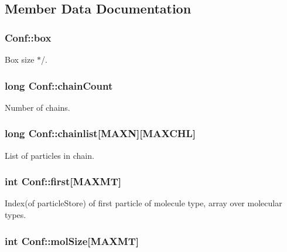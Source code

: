 \subsection{Member Data Documentation}
\hypertarget{class_conf_a98e73199812404fd886619f90f0b26e7}{
\subsubsection[{box}]{ Conf\+::box}}\label{class_conf_a98e73199812404fd886619f90f0b26e7}


Box size $\ast$/. 

\hypertarget{class_conf_a9e62de59bb1879dc0653037155d045a9}{
\subsubsection[{chain\+Count}]{\setlength{\rightskip}{0pt plus 5cm}long Conf\+::chain\+Count}}\label{class_conf_a9e62de59bb1879dc0653037155d045a9}


Number of chains. 

\hypertarget{class_conf_a8da63e8eb7fb59124bea9e082fa447eb}{
\subsubsection[{chainlist}]{\setlength{\rightskip}{0pt plus 5cm}long Conf\+::chainlist\mbox{[}{\bf M\+A\+X\+N}\mbox{]}\mbox{[}{\bf M\+A\+X\+C\+H\+L}\mbox{]}}}\label{class_conf_a8da63e8eb7fb59124bea9e082fa447eb}


List of particles in chain. 

\hypertarget{class_conf_a907de4d9eb23d6480a16007c5087382c}{
\subsubsection[{first}]{\setlength{\rightskip}{0pt plus 5cm}int Conf\+::first\mbox{[}{\bf M\+A\+X\+M\+T}\mbox{]}}}\label{class_conf_a907de4d9eb23d6480a16007c5087382c}


Index(of particle\+Store) of first particle of molecule type, array over molecular types. 

\hypertarget{class_conf_ae8941c30c3bdb0bb5bd33db013a60993}{
\subsubsection[{mol\+Size}]{\setlength{\rightskip}{0pt plus 5cm}int Conf\+::mol\+Size\mbox{[}{\bf M\+A\+X\+M\+T}\mbox{]}}}\label{class_conf_ae8941c30c3bdb0bb5bd33db013a60993}


